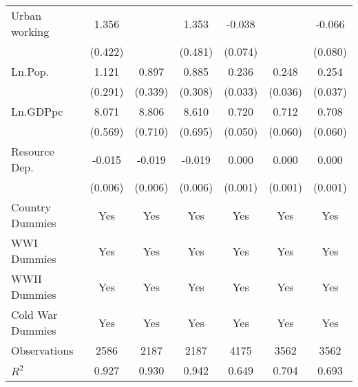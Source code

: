 \begin{table}[htbp]
\begin{tabular}{l*{6}{c}}
Urban working       &       1.356\sym{**} &                     &       1.353\sym{**} &      -0.038         &                     &      -0.066         \\
                    &     (0.422)         &                     &     (0.481)         &     (0.074)         &                     &     (0.080)         \\
[1em]
Ln.Pop.             &       1.121\sym{***}&       0.897\sym{**} &       0.885\sym{**} &       0.236\sym{***}&       0.248\sym{***}&       0.254\sym{***}\\
                    &     (0.291)         &     (0.339)         &     (0.308)         &     (0.033)         &     (0.036)         &     (0.037)         \\
[1em]
Ln.GDPpc            &       8.071\sym{***}&       8.806\sym{***}&       8.610\sym{***}&       0.720\sym{***}&       0.712\sym{***}&       0.708\sym{***}\\
                    &     (0.569)         &     (0.710)         &     (0.695)         &     (0.050)         &     (0.060)         &     (0.060)         \\
[1em]
Resource Dep.       &      -0.015\sym{*}  &      -0.019\sym{**} &      -0.019\sym{**} &       0.000         &       0.000         &       0.000         \\
                    &     (0.006)         &     (0.006)         &     (0.006)         &     (0.001)         &     (0.001)         &     (0.001)         \\
[1em]
Country Dummies     &         Yes         &         Yes         &         Yes         &         Yes         &         Yes         &         Yes         \\
[1em]
WWI Dummies         &         Yes         &         Yes         &         Yes         &         Yes         &         Yes         &         Yes         \\
[1em]
WWII Dummies        &         Yes         &         Yes         &         Yes         &         Yes         &         Yes         &         Yes         \\
[1em]
Cold War Dummies    &         Yes         &         Yes         &         Yes         &         Yes         &         Yes         &         Yes         \\
\hline
Observations        &        2586         &        2187         &        2187         &        4175         &        3562         &        3562         \\
\(R^{2}\)           &       0.927         &       0.930         &       0.942         &       0.649         &       0.704         &       0.693         \\

\end{tabular}
\end{table}
